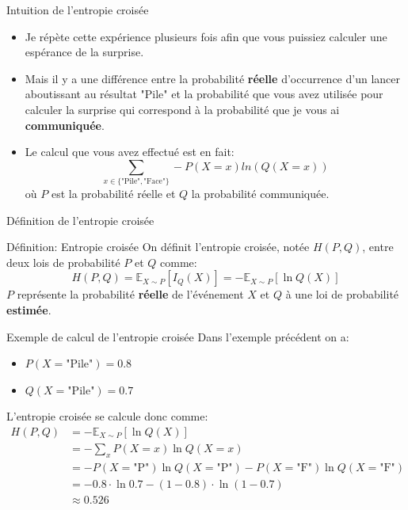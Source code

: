 \begin{frame}{Intuition de l'entropie croisée}
	\begin{itemize}
		\item Je répète cette expérience plusieurs fois afin que vous puissiez calculer une espérance de la surprise.
		\pause
		\item Mais il y a une différence entre la probabilité \textbf{réelle} d'occurrence d'un lancer aboutissant au résultat "Pile" et la probabilité que vous avez utilisée pour calculer la surprise qui correspond à la probabilité que je vous ai \textbf{communiquée}.
		\pause
		\item Le calcul que vous avez effectué est en fait:
		\begin{equation*}
			\sum_{x \in \{\text{"Pile"}, \text{"Face"}\}} - P(X = x) ln(Q(X = x))
		\end{equation*}
		où $P$ est la probabilité réelle et $Q$ la probabilité communiquée.
	\end{itemize}
\end{frame}

\begin{frame}{Définition de l'entropie croisée}
	\begin{block}{Définition: Entropie croisée}
		On définit l'entropie croisée, notée $H(P, Q)$, entre deux lois de probabilité $P$ et $Q$ comme:
		\begin{equation*}
			H(P,Q) = \mathbb{E}_{X \sim P}\left[I_Q(X)\right] = - \mathbb{E}_{X \sim P}\left[\ln Q(X)\right]
		\end{equation*}
		$P$ représente la probabilité \textbf{réelle} de l'événement $X$ et $Q$ à une loi de probabilité \textbf{estimée}.
	\end{block}
\end{frame}

\begin{frame}{Exemple de calcul de l'entropie croisée}
	Dans l'exemple précédent on a:
	\begin{itemize}
		\item $P(X=\text{"Pile"}) = 0.8$
		\item $Q(X=\text{"Pile"}) = 0.7$
	\end{itemize}
	\pause
	L'entropie croisée se calcule donc comme:
	\begin{equation*}
		\begin{aligned}
			H(P,Q)
			&= - \mathbb{E}_{X \sim P}\left[\ln Q(X)\right] \\
			&= - \sum_{x} P(X = x) \ln{Q(X = x)} \\
			&= - P(X = \text{"P"}) \ln{Q(X = \text{"P"})} - P(X = \text{"F"}) \ln{Q(X = \text{"F"})} \\
			&= - 0.8 \cdot \ln{0.7} - (1 - 0.8) \cdot \ln{(1 - 0.7)} \\
			&\approx 0.526
		\end{aligned}
	\end{equation*}
\end{frame}

